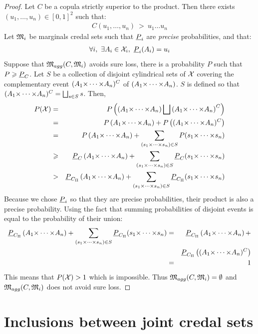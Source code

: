 \begin{proof}
    Let $C$ be a copula strictly superior to the product. Then there exists $(u_1,\dots,u_n)\in[0,1]^2$ such that:
    \begin{eqnarray*}
        C(u_1,\dots, u_n)~>~u_1\dots u_n
    \end{eqnarray*}
    Let ${\mathfrak{M}}_i$ be marginals credal sets such that ${\underline{P}}_i$ are \textit{precise} probabilities, and that:
    \begin{eqnarray*}
        \forall i,~\exists A_i\in{\mathcal{X}}_i,~{\underline{P}}_i(A_i)=u_i
    \end{eqnarray*}
    Suppose that ${\mathfrak{M}}_{agg}(C, {\mathfrak{M}}_i)$ avoids sure loss, \ie there is a probability $P$ such that $P\geqslant{\underline{P}}_C$. Let $S$ be a collection of disjoint cylindrical sets of ${\mathcal{X}}$ covering the complementary event $(A_1{\times\dots\times} A_n)^C$ of $(A_1{\times\dots\times} A_n)$. $S$ is defined so that $(A_1{\times\dots\times} A_n)^C=\bigsqcup_{s\in S}s$.
    Then,
    \begin{eqnarray*}
        P({\mathcal{X}}) &=& P\left(\left(A_1{\times\dots\times} A_n\right)\bigsqcup\left(A_1{\times\dots\times} A_n\right)^C\right)\\
        &=& P\left(A_1{\times\dots\times} A_n\right)+P\left((A_1{\times\dots\times} A_n)^C\right)\\
        &=& P\left(A_1{\times\dots\times} A_n\right)+\sum_{(s_1{\times\dots\times} s_n)\in S}P(s_1{\times\dots\times} s_n)\\
        &\geqslant& {\underline{P}}_C\left(A_1{\times\dots\times} A_n\right)+\sum_{(s_1{\times\dots\times} s_n)\in S}{\underline{P}}_C(s_1{\times\dots\times} s_n)\\
        &>& {\underline{P}}_{C_\Pi}\left(A_1{\times\dots\times} A_n\right)+\sum_{(s_1{\times\dots\times} s_n)\in S}{\underline{P}}_{C_\Pi}(s_1{\times\dots\times} s_n)
    \end{eqnarray*}
    Because we chose ${\underline{P}}_i$ so that they are precise probabilities, their product is also a precise probability. Using the fact that summing probabilities of disjoint events is equal to the probability of their union:
    \begin{eqnarray*}
        {\underline{P}}_{C_\Pi}\left(A_1{\times\dots\times} A_n\right)+\sum_{(s_1{\times\dots\times} s_n)\in S}{\underline{P}}_{C_\Pi}(s_1{\times\dots\times} s_n) &=& {\underline{P}}_{C_\Pi}\left(A_1{\times\dots\times} A_n\right)+\\
        &&{\underline{P}}_{C_\Pi}\left((A_1{\times\dots\times} A_n)^C\right)\\
        &=& 1
    \end{eqnarray*}
    This means that $P({\mathcal{X}})>1$ which is impossible. Thus ${\mathfrak{M}}_{agg}(C, {\mathfrak{M}}_i)=\emptyset$ and ${\mathfrak{M}}_{agg}(C, {\mathfrak{M}}_i)$ does not avoid sure loss.
\end{proof}

\section{Inclusions between joint credal sets}
